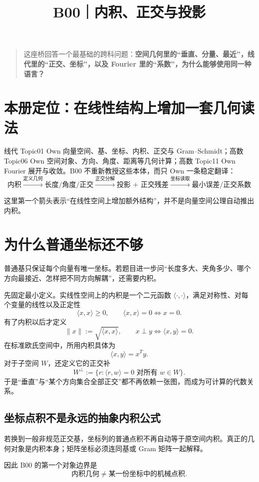 \documentclass[profile=standard]{ipara-handbook}
\title{B00｜内积、正交与投影}
\author{}
\date{}
\begin{document}
\maketitle

\begin{quote}
这座桥回答一个最基础的跨科问题：\textbf{空间几何里的“垂直、分量、最近”，线代里的“正交、坐标”，以及 Fourier 里的“系数”，为什么能够使用同一种语言？}
\end{quote}

\section{本册定位：在线性结构上增加一套几何读法}
线代 Topic01 Own 向量空间、基、坐标、内积、正交与 Gram--Schmidt；高数 Topic06 Own 空间对象、方向、角度、距离等几何计算；高数 Topic11 Own Fourier 展开与收敛。B00 不重新教授这些本体，而只 Own 一条稳定翻译：
\[
\boxed{
\text{内积}
\xrightarrow{\text{定义几何}}
\text{长度/角度/正交}
\xrightarrow{\text{正交分解}}
\text{投影 + 正交残差}
\xrightarrow{\text{坐标读取}}
\text{最小误差/正交系数}
}
\]

这里第一个箭头表示“在线性空间上增加额外结构”，并不是向量空间公理自动推出内积。

\section{为什么普通坐标还不够}
普通基只保证每个向量有唯一坐标。若题目进一步问“长度多大、夹角多少、哪个方向最接近、怎样把不同方向解耦”，还需要内积。

先固定最小定义。实线性空间上的内积是一个二元函数 $\langle\cdot,\cdot\rangle$，满足对称性、对每个变量的线性以及正定性
\[
\langle x,x\rangle\ge0,
\qquad
\langle x,x\rangle=0\Longleftrightarrow x=0.
\]
有了内积以后才定义
\[
\lVert x\rVert:=\sqrt{\langle x,x\rangle},
\qquad
x\perp y\Longleftrightarrow\langle x,y\rangle=0.
\]
在标准欧氏空间中，所用内积具体为
\[
\langle x,y\rangle=x^Ty.
\]
对于子空间 $W$，还定义它的正交补
\[
W^\perp:=\{r:\langle r,w\rangle=0\text{ 对所有 }w\in W\}.
\]
于是“垂直”与“某个方向集合全部正交”都不再依赖一张图，而成为可计算的代数关系。

\subsection{坐标点积不是永远的抽象内积公式}
若换到一般非规范正交基，坐标列的普通点积不再自动等于原空间内积。真正的几何对象是内积本身；矩阵坐标必须连同基或 Gram 矩阵一起解释。

因此 B00 的第一个对象边界是
\[
\boxed{\text{内积几何}\neq\text{某一份坐标中的机械点积}.}
\]
\end{document}
